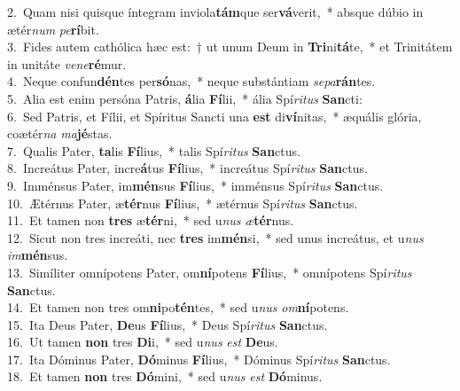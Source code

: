 {2.~}Quam nisi quisque íntegram inviola\textbf{tám}que ser\textbf{vá}verit,~* absque dúbio in ætér\textit{num} \textit{pe}\textbf{rí}bit.\\
{3.~}Fides autem cathólica hæc est:~† ut unum Deum in \textbf{Tri}ni\textbf{tá}te,~* et Trinitátem in unitáte \textit{ve}\textit{ne}\textbf{ré}mur.\\
{4.~}Neque confun\textbf{dén}tes per\textbf{só}nas,~* neque substántiam \textit{se}\textit{pa}\textbf{rán}tes.\\
{5.~}Alia est enim persóna Patris, \textbf{á}lia \textbf{Fí}lii,~* ália Spí\textit{ri}\textit{tus} \textbf{San}cti:\\
{6.~}Sed Patris, et Fílii, et Spíritus Sancti una \textbf{est} di\textbf{ví}nitas,~* æquális glória, coætér\textit{na} \textit{ma}\textbf{jé}stas.\\
{7.~}Qualis Pater, \textbf{ta}lis \textbf{Fí}lius,~* talis Spí\textit{ri}\textit{tus} \textbf{San}ctus.\\
{8.~}Increátus Pater, incre\textbf{á}tus \textbf{Fí}lius,~* increátus Spí\textit{ri}\textit{tus} \textbf{San}ctus.\\
{9.~}Imménsus Pater, im\textbf{mén}sus \textbf{Fí}lius,~* imménsus Spí\textit{ri}\textit{tus} \textbf{San}ctus.\\
{10.~}Ætérnus Pater, æ\textbf{tér}nus \textbf{Fí}lius,~* ætérnus Spí\textit{ri}\textit{tus} \textbf{San}ctus.\\
{11.~}Et tamen non \textbf{tres} æ\textbf{tér}ni,~* sed u\textit{nus} \textit{æ}\textbf{tér}nus.\\
{12.~}Sicut non tres increáti, nec \textbf{tres} im\textbf{mén}si,~* sed unus increátus, et u\textit{nus} \textit{im}\textbf{mén}sus.\\
{13.~}Simíliter omnípotens Pater, om\textbf{ní}potens \textbf{Fí}lius,~* omnípotens Spí\textit{ri}\textit{tus} \textbf{San}ctus.\\
{14.~}Et tamen non tres om\textbf{ni}po\textbf{tén}tes,~* sed u\textit{nus} \textit{om}\textbf{ní}potens.\\
{15.~}Ita Deus Pater, \textbf{De}us \textbf{Fí}lius,~* Deus Spí\textit{ri}\textit{tus} \textbf{San}ctus.\\
{16.~}Ut tamen \textbf{non} tres \textbf{Di}i,~* sed u\textit{nus} \textit{est} \textbf{De}us.\\
{17.~}Ita Dóminus Pater, \textbf{Dó}minus \textbf{Fí}lius,~* Dóminus Spí\textit{ri}\textit{tus} \textbf{San}ctus.\\
{18.~}Et tamen \textbf{non} tres \textbf{Dó}mini,~* sed u\textit{nus} \textit{est} \textbf{Dó}minus.\\

